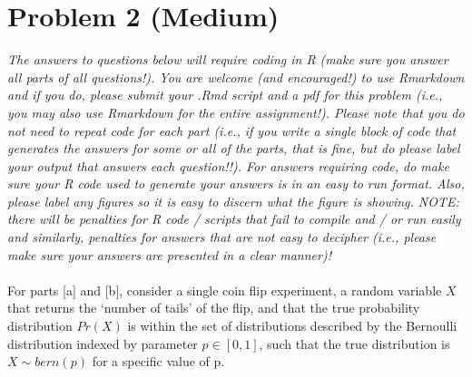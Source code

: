 \documentclass[letterpaper, 11pt]{article}
\begin{document}
\section*{Problem 2 (Medium)}

\textit{The answers to questions below will require coding in R (make sure you answer all parts of all questions!).  You are welcome (and encouraged!) to use Rmarkdown and if you do, please submit your .Rmd script and a pdf for this problem (i.e., you may also use Rmarkdown for the entire assignment!).  Please note that you do not need to repeat code for each part (i.e., if you write a single block of code that generates the answers for some or all of the parts, that is fine, but do please label your output that answers each question!!).  For answers requiring code, do make sure your R code used to generate your answers is in an easy to run format.  Also, please label any figures so it is easy to discern what the figure is showing.  NOTE: there will be penalties for R code / scripts that fail to compile and / or run easily and similarly, penalties for answers that are not easy to decipher (i.e., please make sure your answers are presented in a clear manner)!}
\\
\\
For parts [a] and [b], consider a single coin flip experiment, a random variable $X$ that returns the `number of tails' of the flip, and that the true probability distribution $Pr(X)$ is within the set of distributions described by the Bernoulli distribution indexed by parameter $p \in [0,1]$, such that the true distribution is $X \sim bern(p)$ for a specific value of p.
\end{document}
